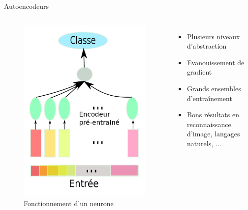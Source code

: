 \documentclass{beamer}
\begin{document}
\begin{frame}{Autoencodeurs}

  \begin{columns}
    \begin{figure}
      \centering
      \includegraphics[scale=0.1750]{../Figures/Class}
      \caption{Fonctionnement d'un neurone}
    \end{figure}

    \begin{itemize}
    \item Plusieurs niveaux d'abstraction \pause
    \item Evanouissement de gradient \pause
    \item Grands ensembles d'entraînement \pause
    \item Bons résultats en reconnaissance d'image, langages naturels, ...
    \end{itemize}
  \end{columns}
  
\end{frame}
\end{document}
